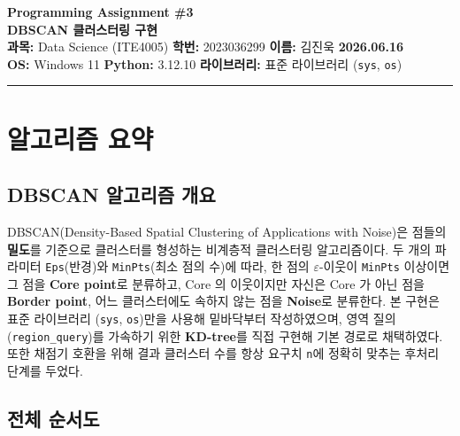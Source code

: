 \documentclass[12pt, a4paper]{article}
\begin{document}
\begin{center}
    {\Large\bfseries Programming Assignment \#3}\\[0.4em]
    {\large\bfseries DBSCAN 클러스터링 구현}\\[1em]
    {\normalsize
        \textbf{과목:} Data Science (ITE4005) \quad
        \textbf{학번:} 2023036299 \quad
        \textbf{이름:} 김진욱 \quad
        \textbf{2026.06.16}\\[0.3em]
        \textbf{OS:} Windows 11 \quad
        \textbf{Python:} 3.12.10 \quad
        \textbf{라이브러리:} 표준 라이브러리 (\texttt{sys}, \texttt{os})
    }
\end{center}
\vspace{0.5em}
\hrule
\vspace{1em}

\section{알고리즘 요약}

\subsection{DBSCAN 알고리즘 개요}

DBSCAN(Density-Based Spatial Clustering of Applications with Noise)은 점들의 \textbf{밀도}를 기준으로 클러스터를 형성하는 비계층적 클러스터링 알고리즘이다. 두 개의 파라미터 \texttt{Eps}(반경)와 \texttt{MinPts}(최소 점의 수)에 따라, 한 점의 $\varepsilon$-이웃이 \texttt{MinPts} 이상이면 그 점을 \textbf{Core point}로 분류하고, Core 의 이웃이지만 자신은 Core 가 아닌 점을 \textbf{Border point}, 어느 클러스터에도 속하지 않는 점을 \textbf{Noise}로 분류한다. 본 구현은 표준 라이브러리 (\texttt{sys}, \texttt{os})만을 사용해 밑바닥부터 작성하였으며, 영역 질의(\texttt{region\_query})를 가속하기 위한 \textbf{KD-tree}를 직접 구현해 기본 경로로 채택하였다. 또한 채점기 호환을 위해 결과 클러스터 수를 항상 요구치 \texttt{n}에 정확히 맞추는 후처리 단계를 두었다.

\subsection{전체 순서도}
\end{document}
